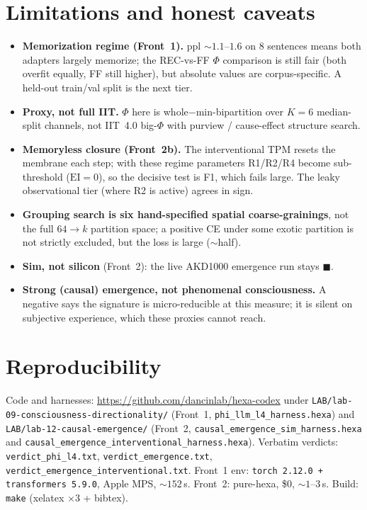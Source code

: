 \documentclass[11pt,a4paper]{article}
\providecommand{\tierOrange}{{\color{orange}$\blacksquare$}}
\begin{document}
\section{Limitations and honest caveats}
\label{sec:limits}

\begin{itemize}\itemsep0.2em
\item \textbf{Memorization regime (Front~1).} ppl ${\sim}1.1$--$1.6$ on 8
  sentences means both adapters largely memorize; the REC-vs-FF $\Phi$ comparison
  is still fair (both overfit equally, FF still higher), but absolute values are
  corpus-specific. A held-out train/val split is the next tier.
\item \textbf{Proxy, not full IIT.} $\Phi$ here is whole$-$min-bipartition over
  $K{=}6$ median-split channels, not IIT~4.0 big-$\Phi$ with purview / cause-effect
  structure search.
\item \textbf{Memoryless closure (Front~2b).} The interventional TPM resets the
  membrane each step; with these regime parameters R1/R2/R4 become sub-threshold
  ($\mathrm{EI}=0$), so the decisive test is F1, which fails large. The leaky
  observational tier (where R2 is active) agrees in sign.
\item \textbf{Grouping search is six hand-specified spatial coarse-grainings},
  not the full $64\to k$ partition space; a positive CE under some exotic
  partition is not strictly excluded, but the loss is large ($\sim$half).
\item \textbf{Sim, not silicon} (Front~2): the live AKD1000 emergence run stays
  \tierOrange.
\item \textbf{Strong (causal) emergence, not phenomenal consciousness.} A
  negative says the signature is micro-reducible at this measure; it is silent on
  subjective experience, which these proxies cannot reach.
\end{itemize}

\section{Reproducibility}
\label{sec:repro}

Code and harnesses: \url{https://github.com/dancinlab/hexa-codex} under
\texttt{LAB/lab-09-consciousness-directionality/} (Front~1,
\texttt{phi\_llm\_l4\_harness.hexa}) and \texttt{LAB/lab-12-causal-emergence/}
(Front~2, \texttt{causal\_emergence\_sim\_harness.hexa} and
\texttt{causal\_emergence\_interventional\_harness.hexa}). Verbatim verdicts:
\texttt{verdict\_phi\_l4.txt}, \texttt{verdict\_emergence.txt},
\texttt{verdict\_emergence\_interventional.txt}. Front~1 env:
\texttt{torch 2.12.0 + transformers 5.9.0}, Apple MPS, ${\sim}152$\,s. Front~2:
pure-hexa, \$0, ${\sim}1$--$3$\,s. Build: \texttt{make} (xelatex $\times 3$ + bibtex).
\end{document}

